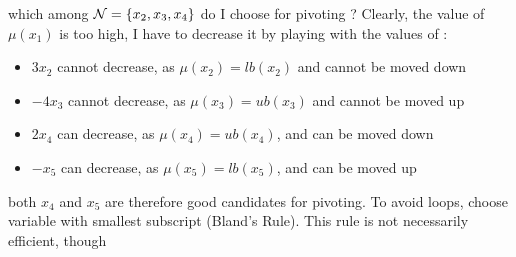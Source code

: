 \begin{frame}
\begin{columns}
  \end{columns}
  \vfill
  which among $\mathcal{N} = \{ x_2, x_3, x_4 \}$ do I choose for pivoting ? Clearly, the value of $\mu(x_1)$
  is too high, I have to decrease it by playing with the values of \nonbas: 
  \begin{itemize}
    \item $  3 x_2$ cannot decrease, as $\mu(x_2) = lb(x_2)$ and cannot be moved down
    \item $- 4 x_3$ cannot decrease, as $\mu(x_3) = ub(x_3)$ and cannot be moved up
    \item $  2 x_4$ can decrease, as  $\mu(x_4) = ub(x_4)$, and can be moved down
    \item $-   x_5$ can decrease, as  $\mu(x_5) = lb(x_5)$, and can be moved up
  \end{itemize}
  \vfill
  both $x_4$ and $x_5$ are therefore good candidates for pivoting. To avoid loops, 
  choose variable with smallest subscript (Bland's Rule). This rule is not necessarily
  efficient, though

\end{frame}

